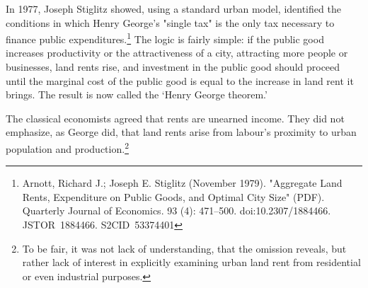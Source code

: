   In 1977, Joseph Stiglitz  showed, using a standard urban model, identified the conditions in which Henry George's "single tax" is  the only tax necessary to finance public expenditures.\footnote{Arnott, Richard J.; Joseph E. Stiglitz (November 1979). "Aggregate Land Rents, Expenditure on Public Goods, and Optimal City Size" (PDF). Quarterly Journal of Economics. 93 (4): 471–500. doi:10.2307/1884466. JSTOR 1884466. S2CID 53374401 }   The logic is fairly simple: if the public good increases productivity or the attractiveness of a city, attracting more people or businesses, land rents rise, and investment in the public good should proceed until the marginal cost of the public good is equal to the increase in land rent it brings. The result is now called the `Henry George theorem.'


The classical economists agreed that rents are unearned income. They did not emphasize, as George did, that land rents arise from labour's proximity to urban population and production.\footnote{To be fair, it was not lack of understanding, that the omission reveals, but rather lack of interest in explicitly examining urban land rent from residential or even industrial purposes.}%







